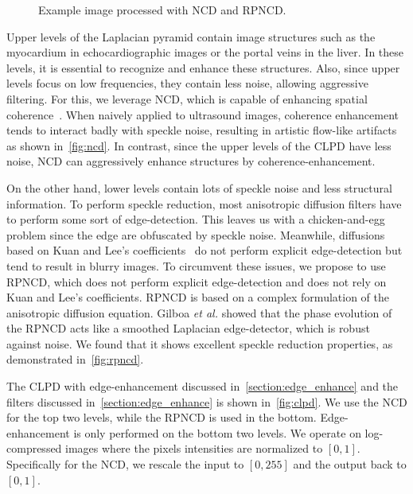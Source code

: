 \begin{figure}[t]
{  }
  \caption{Example image processed with NCD and RPNCD.}\label{fig:ncd_liver}
  \vspace{-0.1in}
\end{figure}
%

Upper levels of the Laplacian pyramid contain image structures such as the myocardium in echocardiographic images or the portal veins in the liver.
In these levels, it is essential to recognize and enhance these structures.
Also, since upper levels focus on low frequencies, they contain less noise, allowing aggressive filtering.
For this, we leverage NCD, which is capable of enhancing spatial coherence~\cite{weickert_coherenceenhancing_1999}.
When naively applied to ultrasound images, coherence enhancement tends to interact badly with speckle noise, resulting in artistic flow-like artifacts as shown in~\cref{fig:ncd}.
In contrast, since the upper levels of the CLPD have less noise, NCD can aggressively enhance structures by coherence-enhancement.

On the other hand, lower levels contain lots of speckle noise and less structural information.
To perform speckle reduction, most anisotropic diffusion filters have to perform some sort of edge-detection.
This leaves us with a chicken-and-egg problem since the edge are obfuscated by speckle noise.
Meanwhile, diffusions based on Kuan and Lee's coefficients~\cite{yongjianyu_speckle_2002, aja-fernandez_estimation_2006, krissian_oriented_2007} do not perform explicit edge-detection but tend to result in blurry images.
To circumvent these issues, we propose to use RPNCD, which does not perform explicit edge-detection and does not rely on Kuan and Lee's coefficients.
RPNCD is based on a complex formulation of the anisotropic diffusion equation.
Gilboa \textit{et al.} showed that the phase evolution of the RPNCD acts like a smoothed Laplacian edge-detector, which is robust against noise.
We found that it shows excellent speckle reduction properties, as demonstrated in~\cref{fig:rpncd}.

The CLPD with edge-enhancement discussed in~\cref{section:edge_enhance} and the filters discussed in~\cref{section:edge_enhance} is shown in~\cref{fig:clpd}.
We use the NCD for the top two levels, while the RPNCD is used in the bottom.
Edge-enhancement is only performed on the bottom two levels.
We operate on log-compressed images where the pixels intensities are normalized to \([0, 1]\).
Specifically for the NCD, we rescale the input to \([0, 255]\) and the output back to \([0, 1]\).

